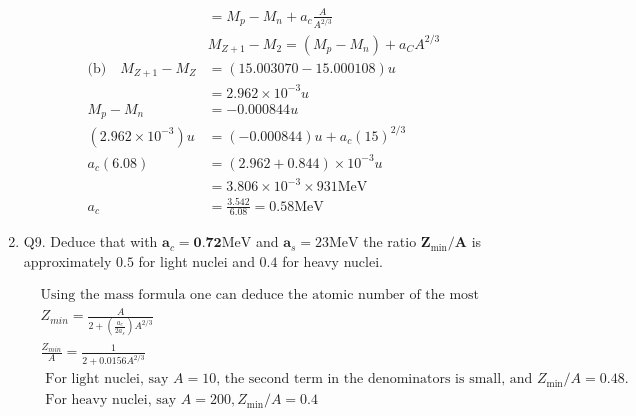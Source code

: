 \begin{enumerate}
\begin{answer}
\begin{align*}
	&=M_p-M_n+a_c \frac{A}{A^{2 / 3}}\\
	&M_{Z+1}-M_2=\left(M_p-M_n\right)+a_C A^{2 / 3}\\
	\text{(b)}\quad M_{Z+1}-M_Z &=(15.003070-15.000108) u \\
	&=2.962 \times 10^{-3} u \\
	M_p-M_n &=-0.000844 u \\
	\left(2.962 \times 10^{-3}\right) u &=(-0.000844) u+a_c(15)^{2 / 3} \\
	a_c(6.08) &=(2.962+0.844) \times 10^{-3} u \\
	&=3.806 \times 10^{-3} \times 931 \mathrm{MeV} \\
	a_c &=\frac{3.542}{6.08}=0.58 \mathrm{MeV}
	\end{align*}
\end{answer}
\item Q9. Deduce that with $\boldsymbol{a}_c=\mathbf{0 . 7 2} \mathrm{MeV}$ and $\boldsymbol{a}_s=23 \mathrm{MeV}$ the ratio $\mathbf{Z}_{\min } / \mathbf{A}$ is approximately $0.5$ for light nuclei and $0.4$ for heavy nuclei.
\begin{answer}
	\begin{align*}
	 &\text{Using the mass formula one can deduce the atomic number of the most stable isobar. It is given by}\\
	&Z_{m i n}=\frac{A}{2+\left(\frac{a_c}{2a_s}\right) A^{2 / 3}} \\
	&\frac{Z_{m i n}}{A}=\frac{1}{2+0.0156 A^{2/3}}\\
&\text{	For light nuclei, say $A=10$, the second term in the denominators is small, and $Z_{\min } / A=0.48$.}\\
&\text{	For heavy nuclei, say $A=200, Z_{\min } / A=0.4$}
	\end{align*}
\end{answer}
\end{enumerate}